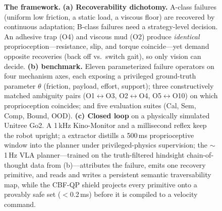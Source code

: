 \begin{figure}[t]
\fi
\caption{\textbf{The \kinovla{} framework.} \textbf{(a) Recoverability dichotomy.}
A-class failures (uniform low friction, a static load, a viscous floor) are
recovered by continuous adaptation; B-class failures need a strategy-level
decision. An adhesive trap (O4) and viscous mud (O2) produce \emph{identical}
proprioception---resistance, slip, and torque coincide---yet demand opposite
recoveries (back off vs.\ switch gait), so only vision can decide. \textbf{(b)
\kinofail{} benchmark.} Eleven parameterized failure operators on four mechanism
axes, each exposing a privileged ground-truth parameter $\theta$ (friction,
payload, effort, support); three constructively matched ambiguity pairs
(O1$\leftrightarrow$O3, O2$\leftrightarrow$O4, O5$\leftrightarrow$O10) on which
proprioception coincides; and five evaluation suites (Cal, Sem, Comp, Bound, OOD).
\textbf{(c) Closed loop} on a physically simulated Unitree Go2. A \mbox{1\,kHz}
Kino-Monitor and a millisecond reflex keep the robot upright; a \kinotokens{}
extractor distills a \mbox{500\,ms} proprioceptive window into the planner under
privileged-physics supervision; the \mbox{$\sim$1\,Hz} VLA planner---trained on the
truth-filtered hindsight chain-of-thought data from (b)---attributes the failure,
emits one recovery primitive, and reads and writes a persistent semantic
traversability map, while the CBF-QP shield projects every primitive onto a
provably safe set ($<$\mbox{0.2\,ms}) before it is compiled to a velocity command.}
\label{fig:system}
\end{figure}
